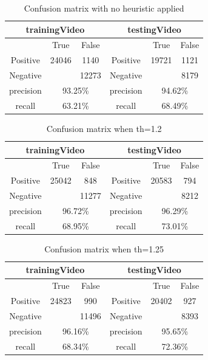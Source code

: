 \documentclass{article}
\begin{document}
\begin{table}[]
\centering
\begin{tabular}{|c|c|c|c|c|c|}
\hline
\multicolumn{3}{|c|}{trainingVideo} & \multicolumn{3}{c|}{testingVideo} \\ \hline
 & True & False &  & True & False \\ \hline
Positive & 24046 & 1140 & Positive & 19721 & 1121 \\ \hline
Negative &  & 12273 & Negative &  & 8179 \\ \hline
precision & \multicolumn{2}{c|}{93.25\%} & precision & \multicolumn{2}{c|}{94.62\%} \\ \hline
recall & \multicolumn{2}{c|}{63.21\%} & recall & \multicolumn{2}{c|}{68.49\%} \\ \hline
\end{tabular}
\caption{Confusion matrix with no heuristic applied}
\end{table}

\begin{table}[]
\centering
\begin{tabular}{|c|c|c|c|c|c|}
\hline
\multicolumn{3}{|c|}{trainingVideo} & \multicolumn{3}{c|}{testingVideo} \\ \hline
 & True & False &  & True & False \\ \hline
Positive & 25042 & 848 & Positive & 20583 & 794 \\ \hline
Negative &  & 11277 & Negative &  & 8212 \\ \hline
precision & \multicolumn{2}{c|}{96.72\%} & precision & \multicolumn{2}{c|}{96.29\%} \\ \hline
recall & \multicolumn{2}{c|}{68.95\%} & recall & \multicolumn{2}{c|}{73.01\%} \\ \hline
\end{tabular}
\caption{Confusion matrix when th=1.2}
\end{table}

\begin{table}[]
\centering
\begin{tabular}{|c|c|c|c|c|c|}
\hline
\multicolumn{3}{|c|}{trainingVideo} & \multicolumn{3}{c|}{testingVideo} \\ \hline
 & True & False &  & True & False \\ \hline
Positive & 24823 & 990 & Positive & 20402 & 927 \\ \hline
Negative &  & 11496 & Negative &  & 8393 \\ \hline
precision & \multicolumn{2}{c|}{96.16\%} & precision & \multicolumn{2}{c|}{95.65\%} \\ \hline
recall & \multicolumn{2}{c|}{68.34\%} & recall & \multicolumn{2}{c|}{72.36\%} \\ \hline
\end{tabular}
\caption{Confusion matrix when th=1.25}
\end{table}
\end{document}
